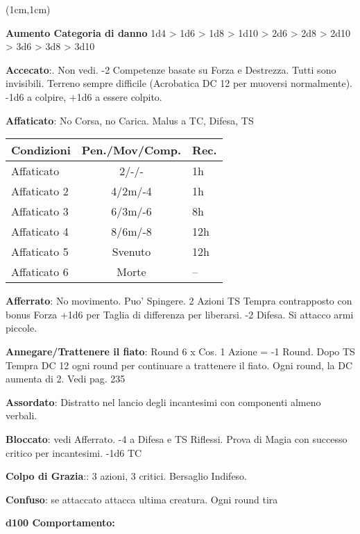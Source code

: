 \documentclass[a4paper,12 pt,openany]{book}
\begin{document}
\center

\footnotesize

\begin{textblock*}{19 cm}(1cm,1cm) %
\flushleft

\begin{multicols}{2}
	
\textbf{Aumento Categoria di danno} 1d4 > 1d6 > 1d8 > 1d10 > 2d6 > 2d8 > 2d10 > 3d6 > 3d8 > 3d10

\textbf{Accecato}:. Non vedi. -2  Competenze basate su Forza e Destrezza. Tutti sono invisibili. Terreno sempre difficile (Acrobatica DC 12 per muoversi normalmente). -1d6 a colpire, +1d6 a essere colpito.

\textbf{Affaticato}: No Corsa, no Carica. Malus a TC, Difesa, TS

\begin{tabularx}{0.45\textwidth}{lcl}
	\textbf{Condizioni}& \textbf{Pen./Mov/Comp.}&\textbf{Rec.}\\
	\hline
	Affaticato &2/-/-&1h\\
	Affaticato 2&4/2m/-4&1h\\
	Affaticato 3&6/3m/-6&8h\\
	Affaticato 4&8/6m/-8&12h\\
	Affaticato 5&Svenuto&12h\\
	Affaticato 6&Morte&--\\
\end{tabularx}

\textbf{Afferrato}: No movimento. Puo' Spingere. 2 Azioni TS Tempra contrapposto con bonus Forza +1d6 per Taglia di differenza per liberarsi. -2 Difesa. Si attacco armi piccole.

\textbf{Annegare/Trattenere il fiato}: Round 6 x Cos. 1 Azione = -1 Round. Dopo TS Tempra DC 12 ogni round per continuare a trattenere il fiato. Ogni round, la DC aumenta di 2. Vedi pag. 235

\textbf{Assordato}: Distratto nel lancio degli incantesimi con componenti almeno verbali.

\textbf{Bloccato}: vedi Afferrato. -4 a Difesa e TS Riflessi. Prova di Magia con successo critico per incantesimi. -1d6 TC

\textbf{Colpo di Grazia}:: 3 azioni, 3 critici. Bersaglio Indifeso.

\textbf{Confuso}: se attaccato attacca ultima creatura.
Ogni round tira

\textbf{d100 Comportamento:}


\end{multicols}
\end{textblock*}
\end{document}
